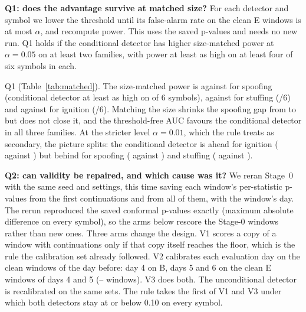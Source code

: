 \documentclass[journal]{IEEEtran}
\begin{document}
\textbf{Q1: does the advantage survive at matched size?} For each detector and symbol we lower the threshold
until its false-alarm rate on the clean E windows is at most $\alpha$, and recompute power. This uses the saved
p-values and needs no new run. Q1 holds if the conditional detector has higher size-matched power at
$\alpha=0.05$ on at least two families, with power at least as high on at least four of six symbols in each.

Q1 \qOneHolds{} (Table~\ref{tab:matched}). The size-matched power is \mpowGenSpoof{} against \mpowUncSpoof{} for
spoofing (conditional detector at least as high on \mpowSymWinsSpoof{} of 6 symbols), \mpowGenStuff{} against
\mpowUncStuff{} for stuffing (\mpowSymWinsStuff/6) and \mpowGenIgnit{} against \mpowUncIgnit{} for ignition
(\mpowSymWinsIgnit/6). Matching the size shrinks the spoofing gap from \gapSpoof{} to \mgapSpoof{} but does not close it, and the
threshold-free AUC favours the conditional detector in all three families. At the stricter level
$\alpha=0.01$, which the rule treats as secondary, the picture splits: the conditional detector is ahead for
ignition (\mpowStrictGenIgnit{} against \mpowStrictUncIgnit) but behind for spoofing (\mpowStrictGenSpoof{}
against \mpowStrictUncSpoof) and stuffing (\mpowStrictGenStuff{} against \mpowStrictUncStuff).

\begin{table}[t]
\centering
\caption{Follow-up Q1: power with each detector's threshold set so that its false-alarm rate on clean evaluation
windows is at most $\alpha$, and the AUC between clean and injected copies; means over strengths and symbols.
Bold: the higher of the pair.}
\label{tab:matched}
\setlength{\tabcolsep}{3pt}
\resizebox{\columnwidth}{!}{}
\end{table}

\textbf{Q2: can validity be repaired, and which cause was it?} We reran Stage~0 with the same seed and settings,
this time saving each window's per-statistic p-values from the first \Msim{} continuations and from all of them,
with the window's day. The rerun reproduced the saved conformal p-values exactly (maximum absolute difference
\integrityMaxDiff{} on every symbol), so the arms below rescore the Stage-0 windows rather than new ones. Three
arms change the design. V1 scores a copy of a window with \Mrefine{} continuations only if that copy itself
reaches the floor, which is the rule the calibration set already followed. V2 calibrates each evaluation day on
the clean windows of the day before: day 4 on B, days 5 and 6 on the clean E windows of days 4 and 5
(\nCalRollLo--\nCalRollHi{} windows). V3 does both. The unconditional detector is recalibrated on the same sets.
The rule takes the first of V1 and V3 under which both detectors stay at or below 0.10 on every symbol.
\end{document}
